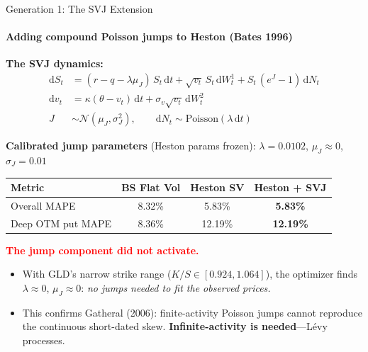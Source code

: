 \documentclass[aspectratio=169]{beamer}
\begin{document}
\begin{frame}{Generation 1: The SVJ Extension}
\framesubtitle{Adding compound Poisson jumps to Heston (Bates 1996)}
\small

\textbf{The SVJ dynamics:}
\begin{align*}
\mathrm{d}S_t &= (r-q-\lambda\mu_J)\,S_t\,\mathrm{d}t + \sqrt{v_t}\,S_t\,\mathrm{d}W_t^1 + S_t\,(e^{J}-1)\,\mathrm{d}N_t\\[2pt]
\mathrm{d}v_t &= \kappa(\theta-v_t)\,\mathrm{d}t + \sigma_v\sqrt{v_t}\,\mathrm{d}W_t^2\\[2pt]
J &\sim \mathcal{N}(\mu_J,\sigma_J^2),\qquad \mathrm{d}N_t \sim \text{Poisson}(\lambda\,\mathrm{d}t)
\end{align*}

\textbf{Calibrated jump parameters} (Heston params frozen):
\quad $\lambda = 0.0102$, \quad $\mu_J \approx 0$, \quad $\sigma_J = 0.01$

\centering
\small
\begin{tabular}{@{}lccc@{}}\toprule
\textbf{Metric} & \textbf{BS Flat Vol} & \textbf{Heston SV} & \textbf{Heston + SVJ}\\\midrule
Overall MAPE & 8.32\% & 5.83\% & \textbf{5.83\%}\\
Deep OTM put MAPE & 8.36\% & 12.19\% & \textbf{12.19\%}\\\bottomrule
\end{tabular}

\textcolor{red}{\textbf{The jump component did not activate.}}

\vspace{0.2cm}
\footnotesize
\begin{itemize}
\item With GLD's narrow strike range ($K/S \in [0.924, 1.064]$), the optimizer finds
$\lambda \approx 0$, $\mu_J \approx 0$: \emph{no jumps needed to fit the observed prices.}
\item This confirms Gatheral (2006): finite-activity Poisson jumps cannot reproduce\\[1pt]
the continuous short-dated skew. \textbf{Infinite-activity is needed}---L\'evy processes.
\end{itemize}

\end{frame}
\end{document}
